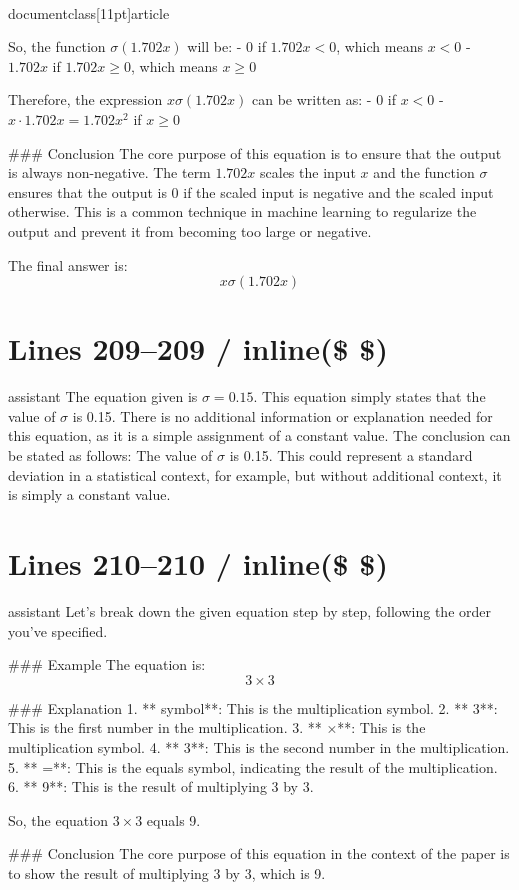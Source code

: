 \\documentclass[11pt]{article}
\begin{document}
So, the function \(\sigma(1.702 x)\) will be:
- 0 if \(1.702 x < 0\), which means \(x < 0\)
- \(1.702 x\) if \(1.702 x \geq 0\), which means \(x \geq 0\)

Therefore, the expression \(x \sigma(1.702 x)\) can be written as:
- \(0\) if \(x < 0\)
- \(x \cdot 1.702 x = 1.702 x^2\) if \(x \geq 0\)

### Conclusion
The core purpose of this equation is to ensure that the output is always non-negative. The term \(1.702 x\) scales the input \(x\) and the function \(\sigma\) ensures that the output is 0 if the scaled input is negative and the scaled input otherwise. This is a common technique in machine learning to regularize the output and prevent it from becoming too large or negative.

The final answer is:
\[
\boxed{x \sigma(1.702 x)}
\]


\section*{Lines 209–209 / inline(\$ \$) }
assistant
The equation given is \(\sigma = 0.15\). This equation simply states that the value of \(\sigma\) is 0.15. There is no additional information or explanation needed for this equation, as it is a simple assignment of a constant value. The conclusion can be stated as follows: The value of \(\sigma\) is 0.15. This could represent a standard deviation in a statistical context, for example, but without additional context, it is simply a constant value.


\section*{Lines 210–210 / inline(\$ \$) }
assistant
Let's break down the given equation step by step, following the order you've specified.

### Example
The equation is:
\[ 3 \times 3 \]

### Explanation
1. ** symbol**: This is the multiplication symbol.
2. ** 3**: This is the first number in the multiplication.
3. ** ×**: This is the multiplication symbol.
4. ** 3**: This is the second number in the multiplication.
5. ** =**: This is the equals symbol, indicating the result of the multiplication.
6. ** 9**: This is the result of multiplying 3 by 3.

So, the equation \( 3 \times 3 \) equals 9.

### Conclusion
The core purpose of this equation in the context of the paper is to show the result of multiplying 3 by 3, which is 9.
\end{document}
